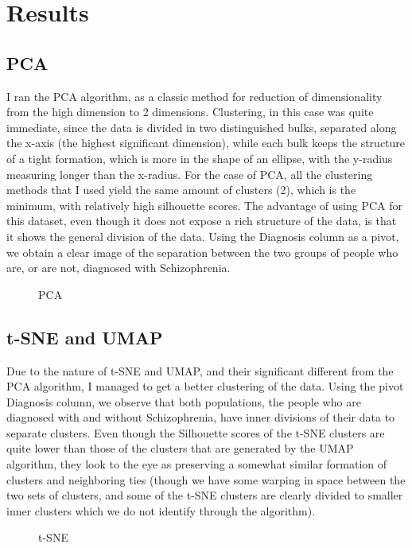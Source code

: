 \documentclass{article}
\begin{document}
\section{Results}
\subsection{PCA}
I ran the PCA algorithm, as a classic method for reduction of dimensionality from the high dimension to 2 dimensions. Clustering, in this case was quite immediate, since the data is divided in two distinguished bulks, separated along the x-axis (the highest significant dimension), while each bulk keeps the structure of a tight formation, which is more in the shape of an ellipse, with the y-radius measuring longer than the x-radius. For the case of PCA, all the clustering methods that I used yield the same amount of clusters (2), which is the minimum, with relatively high silhouette scores. The advantage of using PCA for this dataset, even though it does not expose a rich structure of the data, is that it shows the general division of the data. Using the Diagnosis column as a pivot, we obtain a clear image of the separation between the two groups of people who are, or are not, diagnosed with Schizophrenia.

\begin{figure}[H]
    \centering
    \caption{PCA}
\end{figure}

\subsection{t-SNE and UMAP}
Due to the nature of t-SNE and UMAP, and their significant different from the PCA algorithm, I managed to get a better clustering of the data. Using the pivot Diagnosis column, we observe that both populations, the people who are diagnosed with and without Schizophrenia, have inner divisions of their data to separate clusters. Even though the Silhouette scores of the t-SNE clusters are quite lower than those of the clusters that are generated by the UMAP algorithm, they look to the eye as preserving a somewhat similar formation of clusters and neighboring ties (though we have some warping in space between the two sets of clusters, and some of the t-SNE clusters are clearly divided to smaller inner clusters which we do not identify through the algorithm). 
\begin{figure}[H]
    \centering
    \caption{t-SNE}
\end{figure}
\end{document}
